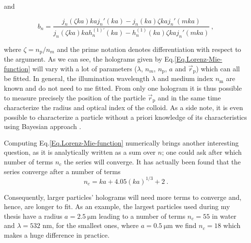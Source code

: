 and

\begin{equation}
	b_n =
	\frac
	{
		j_n(\zeta k a) kaj_n'(ka) - j_n (ka) \zeta kaj_n'(mka)
	}
	{
		j_n(\zeta k a) kah_n^{(1)'}(ka) - h_n^{(1)} (ka) \zeta kaj_n '(mka)
	} ~,
\end{equation}


	where $\zeta = n_\mathrm{p} / n_m$ and the prime notation denotes differentiation with respect to the argument. As we can see, the holograms given by Eq.\ref{Eq.Lorenz-Mie-function} will vary with a lot of parameters ($\lambda$, $n_m$, $n_\mathrm{p}$, $a$ and $\vec{r}_\mathrm{p}$) which can all be fitted. In general, the illumination wavelength $\lambda$ and medium index $n_\mathrm{m}$ are known and do not need to me fitted. From only one hologram it is thus possible to measure precisely the position of the particle $\vec{r}_\mathrm{p}$ and in the same time characterize the radius and optical index of the colloid. As a side note, it is even possible to characterize a particle without a priori knowledge of its characteristics using Bayesian approach \cite{gregory_bayesian_2005, dimiduk_bayesian_2016}.

Computing Eq.\ref{Eq.Lorenz-Mie-function} numerically brings another interesting question, as it is analytically written as a sum over $n$; one could ask after which number of terms $n_c$ the series will converge. It has actually been found that the series converge after a number of terms \cite{lentz_generating_1976}
\begin{equation}
	n_c = k a + 4.05 (k a)^{1/3} + 2 ~.
\end{equation}

Consequently, larger particles' holograms will need more terms to converge and, hence, are longer to fit. As an example, the largest particles used during my thesis have a radius $a = 2.5 ~ \mathrm{\mu m}$ leading to a number of terms $ n_c = 55$ in water and $\lambda = 532$ nm, for the smallest ones, where $a = 0.5 ~ \mathrm{\mu m}$ we find $n_c = 18$ which makes a huge difference in practice.

